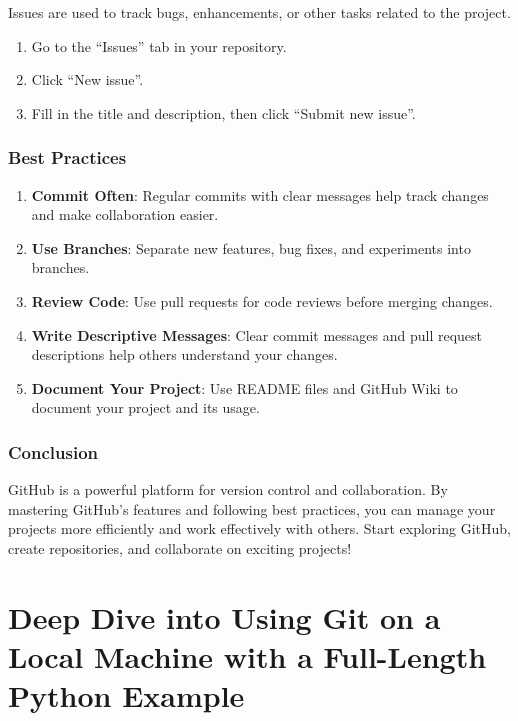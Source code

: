 \documentclass[
  letterpaper,
  DIV=11,
  numbers=noendperiod]{scrreprt}
\providecommand{\tightlist}{%
  \setlength{\itemsep}{0pt}\setlength{\parskip}{0pt}}\usepackage{longtable,booktabs,array}
\begin{document}
Issues are used to track bugs, enhancements, or other tasks related to
the project.

\begin{enumerate}
\def\labelenumi{\arabic{enumi}.}
\tightlist
\item
  Go to the ``Issues'' tab in your repository.
\item
  Click ``New issue''.
\item
  Fill in the title and description, then click ``Submit new issue''.
\end{enumerate}

\subsection{Best Practices}\label{best-practices-13}

\begin{enumerate}
\def\labelenumi{\arabic{enumi}.}
\tightlist
\item
  \textbf{Commit Often}: Regular commits with clear messages help track
  changes and make collaboration easier.
\item
  \textbf{Use Branches}: Separate new features, bug fixes, and
  experiments into branches.
\item
  \textbf{Review Code}: Use pull requests for code reviews before
  merging changes.
\item
  \textbf{Write Descriptive Messages}: Clear commit messages and pull
  request descriptions help others understand your changes.
\item
  \textbf{Document Your Project}: Use README files and GitHub Wiki to
  document your project and its usage.
\end{enumerate}

\subsection{Conclusion}\label{conclusion-56}

GitHub is a powerful platform for version control and collaboration. By
mastering GitHub's features and following best practices, you can manage
your projects more efficiently and work effectively with others. Start
exploring GitHub, create repositories, and collaborate on exciting
projects!


\chapter{Deep Dive into Using Git on a Local Machine with a Full-Length
Python
Example}\label{deep-dive-into-using-git-on-a-local-machine-with-a-full-length-python-example}
\end{document}

